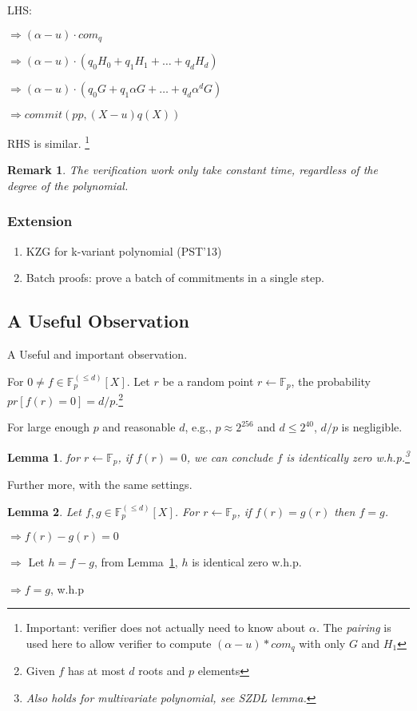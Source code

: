 \documentclass[10pt]{article}
\newtheorem{lemma}{Lemma}
\newtheorem*{remark*}{Remark}
\newcommand{\FFamily}{\mathbb{F}^{(\leq d)}_p[X]}
\newcommand{\FField}{\mathbb{F}_p}
\begin{document}
LHS:
\begin{description}
    \item $\Rightarrow (\alpha - u) \cdot com_q$
    \item $\Rightarrow (\alpha - u) \cdot (q_0 H_0 + q_1 H_1 + \ldots + q_d H_d)$
    \item $\Rightarrow (\alpha - u) \cdot (q_0 G + q_1 \alpha G + \ldots + q_d \alpha^d G)$
    \item $\Rightarrow commit(pp, (X-u)q(X))$
\end{description}
RHS is similar. \footnote{Important: verifier does not actually need to know
about $\alpha$. The \emph{pairing} is used here to allow verifier to compute
$(\alpha - u) * com_q$ with only $G$ and $H_1$}
\begin{remark*}
    The verification work only take constant time, regardless of the degree of
    the polynomial.
\end{remark*}

\subsubsection*{Extension}
\begin{enumerate}
    \item KZG for k-variant polynomial (PST'13)
    \item Batch proofs: prove a batch of commitments in a single step.
\end{enumerate}


\subsection{A Useful Observation}
A Useful and important observation.

For $0 \neq f \in \FFamily$.
Let $r$ be a random point $r \leftarrow \FField$, the probability 
$pr[f(r) = 0] = d/p$.\footnote{Given $f$ has at most $d$ roots and $p$ elements}

For large enough $p$ and reasonable $d$, e.g., $p \approx 2^{256}$ and $d \leq
2^{40}$, $d/p$ is negligible.

\begin{lemma}\label{observation1}
    for $r \leftarrow \FField$, if $f(r) = 0$, we can conclude $f$ is
    identically zero w.h.p.\footnote{Also holds for multivariate polynomial,
    see SZDL lemma.}
\end{lemma}

Further more, with the same settings. \\
\begin{lemma}\label{observation2}
Let $f, g \in \FFamily$. For $r \leftarrow \FField$, if
$f(r) = g(r)$ then $f = g$.
\end{lemma}
\begin{description}
    \item $\Rightarrow f(r) - g(r) = 0$
    \item $\Rightarrow$ Let $h = f - g$, from Lemma~\ref{observation1}, $h$ is
        identical zero w.h.p.
    \item $\Rightarrow f = g$, w.h.p
\end{description}
\end{document}
